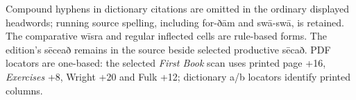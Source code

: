 Compound hyphens in dictionary citations are omitted in the ordinary displayed headwords; running source spelling, including for-ðām and swā-swā, is retained. The comparative wīsra and regular inflected cells are rule-based forms. The edition’s sēceað remains in the source beside selected productive sēcað. PDF locators are one-based: the selected \emph{First Book} scan uses printed page +16, \emph{Exercises} +8, Wright +20 and Fulk +12; dictionary a/\allowbreak{}b locators identify printed columns.

\endgroup

